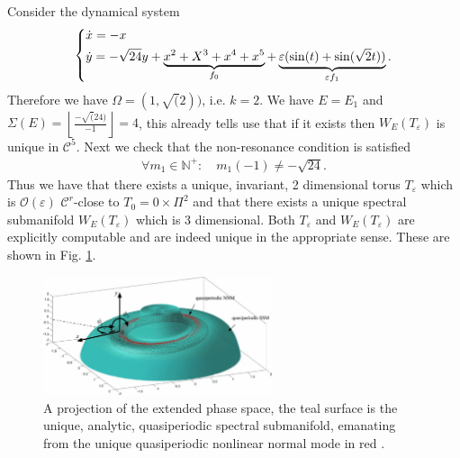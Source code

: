 \begin{ex}[]
	Consider the dynamical system
	\begin{align}
		\begin{dcases}
			\dot{x} = -x \\
			\dot{y} = -\sqrt{24}y + \underbrace{x^2 + X^3 + x^4 + x^5}_{f_0} + \underbrace{\varepsilon(\sin(t) + \sin(\sqrt{2}t))}_{\varepsilon f_1}.
		\end{dcases}
	\end{align}
	Therefore we have $\Omega = (1,\sqrt(2))$, i.e. $k=2$. We have $E = E_1$ and $\Sigma(E) = \left\lfloor \frac{- \sqrt(24)}{-1}\right\rfloor = 4$, this already tells use that if it exists then $W_{E}(T_{\varepsilon})$ is unique in $\mathcal{C}^{5}$. Next we check that the non-resonance condition is satisfied
	\begin{align}
		\forall m_1\in\mathbb{N}^{+}: \quad m_1(-1) \neq - \sqrt{24}.
	\end{align}
	Thus we have that there exists a unique, invariant, 2 dimensional torus $T_{\varepsilon}$ which is $\mathcal{O}(\varepsilon)$ $\mathcal{C}^{r}$-close to $T_0=0\times\Pi^{2}$ and that there exists a unique spectral submanifold $W_{E}(T_{\varepsilon})$ which is 3 dimensional. Both $T_{\varepsilon}$ and $W_{E}(T_\varepsilon)$ are explicitly computable and are indeed unique in the appropriate sense. These are shown in Fig. \ref{fig:ssm_ex2}.
	\begin{figure}[h!]
		\centering
		\includegraphics[width=0.6\textwidth]{figures/ch9/ponsioen2016.pdf}
		\caption{A projection of the extended phase space, the teal surface is the unique, analytic, quasiperiodic spectral submanifold, emanating from the unique quasiperiodic nonlinear normal mode in red \cite{Ponsioen2016}.}
		\label{fig:ssm_ex2}
	\end{figure}	
\end{ex}


